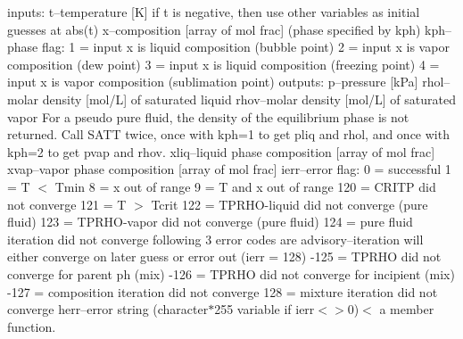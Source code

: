 inputs\+: t--temperature \mbox{[}K\mbox{]} if t is negative, then use other variables as initial guesses at abs(t) x--composition \mbox{[}array of mol frac\mbox{]} (phase specified by kph) kph--phase flag\+: 1 = input x is liquid composition (bubble point) 2 = input x is vapor composition (dew point) 3 = input x is liquid composition (freezing point) 4 = input x is vapor composition (sublimation point) outputs\+: p--pressure \mbox{[}k\+Pa\mbox{]} rhol--molar density \mbox{[}mol/L\mbox{]} of saturated liquid rhov--molar density \mbox{[}mol/L\mbox{]} of saturated vapor For a pseudo pure fluid, the density of the equilibrium phase is not returned. Call S\+A\+TT twice, once with kph=1 to get pliq and rhol, and once with kph=2 to get pvap and rhov. xliq--liquid phase composition \mbox{[}array of mol frac\mbox{]} xvap--vapor phase composition \mbox{[}array of mol frac\mbox{]} ierr--error flag\+: 0 = successful 1 = T $<$ Tmin 8 = x out of range 9 = T and x out of range 120 = C\+R\+I\+TP did not converge 121 = T $>$ Tcrit 122 = T\+P\+R\+H\+O-\/liquid did not converge (pure fluid) 123 = T\+P\+R\+H\+O-\/vapor did not converge (pure fluid) 124 = pure fluid iteration did not converge following 3 error codes are advisory--iteration will either converge on later guess or error out (ierr = 128) -\/125 = T\+P\+R\+HO did not converge for parent ph (mix) -\/126 = T\+P\+R\+HO did not converge for incipient (mix) -\/127 = composition iteration did not converge 128 = mixture iteration did not converge herr--error string (character$\ast$255 variable if ierr$<$$>$0)$<$ a member function. \hypertarget{class_m_c_s_1_1_i_ref_prop64_af3118758f037360f67683b9eab35acbf}{}\label{class_m_c_s_1_1_i_ref_prop64_af3118758f037360f67683b9eab35acbf} 
